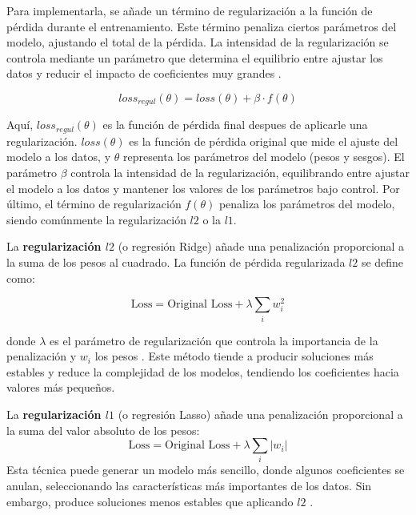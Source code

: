 Para implementarla, se añade un término de regularización a la función de pérdida durante el entrenamiento. Este término penaliza ciertos parámetros del modelo, ajustando el total de la pérdida. La intensidad de la regularización se controla mediante un parámetro que determina el equilibrio entre ajustar los datos y reducir el impacto de coeficientes muy grandes \citep{geron2022hands}.

\begin{equation}
loss_{regul}(\theta) = loss(\theta) + \beta \cdot f(\theta) 
\end{equation}

Aquí, \( loss_{regul}(\theta) \) es la función de pérdida final despues de aplicarle una regularización. \( loss(\theta) \) es la función de pérdida original que mide el ajuste del modelo a los datos, y \( \theta \) representa los parámetros del modelo (pesos y sesgos). El parámetro \(\beta\) controla la intensidad de la regularización, equilibrando entre ajustar el modelo a los datos y mantener los valores de los parámetros bajo control. Por último, el término de regularización \( f(\theta) \) penaliza los parámetros del modelo, siendo comúnmente la regularización $l2$ o la $l1$. 
 

La \textbf{regularización \(l2\)} (o regresión Ridge) añade una penalización proporcional a la suma de los pesos al cuadrado. La función de pérdida regularizada \(l2\) se define como:

\begin{equation}
\text{Loss} = \text{Original Loss} + \lambda \sum_{i} w_i^2
\end{equation}

donde \(\lambda\) es el parámetro de regularización que controla la importancia de la penalización y $w_i$ los pesos \citep{geron2022hands}. Este método tiende a producir soluciones más estables y reduce la complejidad de los modelos, tendiendo los coeficientes hacia valores más pequeños.


La \textbf{regularización \(l1\)} (o regresión Lasso) añade una penalización proporcional a la suma del valor absoluto de los pesos:
\begin{equation}
\text{Loss} = \text{Original Loss} + \lambda \sum_{i} |w_i|
\end{equation}
Esta técnica puede generar un modelo más sencillo, donde algunos coeficientes se anulan, seleccionando las características más importantes de los datos. Sin embargo, produce soluciones menos estables que aplicando $l2$ \citep{geron2022hands}. 


